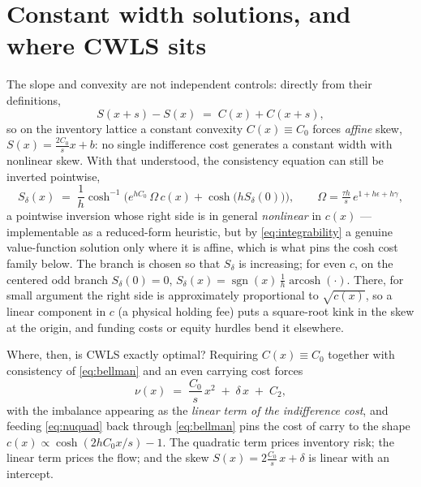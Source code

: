 \documentclass[11pt]{article}
\begin{document}
\section{Constant width solutions, and where CWLS sits}\label{sec:closed}

The slope and convexity are not independent controls: directly from their definitions,
\begin{equation}
S(x+s) - S(x) \;=\; C(x) + C(x+s),
\label{eq:integrability}
\end{equation}
so on the inventory lattice a constant convexity $C(x) \equiv C_0$ forces \emph{affine} skew, $S(x) = \tfrac{2C_0}{s}x + b$: no single indifference cost generates a constant width with nonlinear skew. With that understood, the consistency equation can still be inverted pointwise,
\begin{equation}
S_\delta(x) \;=\; \frac1h \cosh^{-1}\!\Big( e^{hC_0}\,\Omega\,c(x) + \cosh\big(hS_\delta(0)\big) \Big),
\qquad \Omega = \tfrac{\tau h}{s}\,e^{1+h\epsilon+h\gamma},
\label{eq:coshinv}
\end{equation}
a pointwise inversion whose right side is in general \emph{nonlinear} in $c(x)$ --- implementable as a reduced-form heuristic, but by \eqref{eq:integrability} a genuine value-function solution only where it is affine, which is what pins the cosh cost family below. The branch is chosen so that $S_\delta$ is increasing; for even $c$, on the centered odd branch $S_\delta(0) = 0$, $S_\delta(x) = \operatorname{sgn}(x)\,\tfrac1h\operatorname{arcosh}(\cdot)$. There, for small argument the right side is approximately proportional to $\sqrt{c(x)}$, so a linear component in $c$ (a physical holding fee) puts a square-root kink in the skew at the origin, and funding costs or equity hurdles bend it elsewhere.

Where, then, is CWLS exactly optimal? Requiring $C(x) \equiv C_0$ together with consistency of \eqref{eq:bellman} and an even carrying cost forces
\begin{equation}
\nu(x) \;=\; \frac{C_0}{s}\,x^{2} \;+\; \delta\,x \;+\; C_2 ,
\label{eq:nuquad}
\end{equation}
with the imbalance appearing as the \emph{linear term of the indifference cost}, and feeding \eqref{eq:nuquad} back through \eqref{eq:bellman} pins the cost of carry to the shape $c(x) \propto \cosh(2hC_0 x/s) - 1$. The quadratic term prices inventory risk; the linear term prices the flow; and the skew $S(x) = 2\tfrac{C_0}{s}\,x + \delta$ is linear with an intercept.
\end{document}

